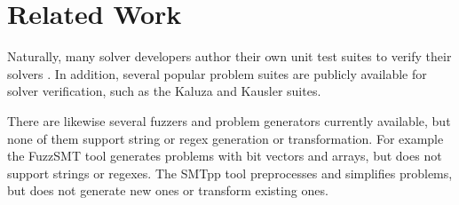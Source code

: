\section{Related Work}

    Naturally, many solver developers author their own unit test suites to verify their solvers \cite{cvc4-tests} \cite{z3str3-tests} \cite{z3str2-tests}. In addition, several popular problem suites are publicly available for solver verification, such as the Kaluza \cite{kaluza} and Kausler \cite{kausler} suites.

    There are likewise several fuzzers and problem generators currently available, but none of them support string or regex generation or transformation. For example the FuzzSMT\cite{fuzzsmt} tool generates \smt{} problems with bit vectors and arrays, but does not support strings or regexes. The SMTpp\cite{smtpp} tool preprocesses and simplifies problems, but does not generate new ones or transform existing ones.

